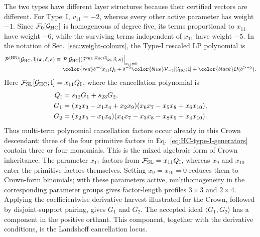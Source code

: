 \documentclass[a4paper,11pt]{article}
\newcommand{\x}{\boldsymbol{x}}
\newcommand{\s}{\boldsymbol{s}}
\newcommand{\HR}{\mathrm{HR}}
\newcommand{\SLcolour}[1]{{\color{red}#1}}
\newcommand{\HRcolour}[1]{{\color{blue}#1}}
\newcommand{\Othercolour}[1]{{\color{black}#1}}
\begin{document}
The two types have different layer structures because their certified vectors
are different.  For Type~I, \(v_{11}=-2\), whereas every other active parameter
has weight \(-1\).  Since \(\mathcal F_0[\mathcal G_{\rm HC}]\) is homogeneous
of degree five, its terms proportional to \(x_{11}\) have weight \(-6\), while
the surviving terms independent of \(x_{11}\) have weight \(-5\).  In the
notation of Sec.~\ref{sec:weight-colours}, the Type-I rescaled LP polynomial is
\begin{equation}
\begin{aligned}
 \mathcal P^{(\HR)}[\mathcal G_{\rm HC};{\rm I}](\x;\delta,\s)
 &\equiv
 \left.\mathcal P[\mathcal G_{\rm HC}]
   (\delta^{\boldsymbol v_{\HR}[\mathcal G_{\rm HC};{\rm I}]}\x;
    \delta,\s)\right|_{x_{12}=0}
 \\[-1mm]
 &=\SLcolour{\delta^{-6}x_{11}Q_{\rm I}}
  +\delta^{-5}\HRcolour{\mathcal P_{-5}[\mathcal G_{\rm HC};{\rm I}]}
  +\Othercolour{\mathcal O(\delta^{>-5})}.
\end{aligned}
 \label{eq:HC-type-I-decomposition}
\end{equation}
Here \(\mathcal F_{\rm SL}[\mathcal G_{\rm HC};{\rm I}]=x_{11}Q_{\rm I}\),
where the cancellation polynomial is
\begin{align}
 Q_{\rm I}&=s_{12}G_1+s_{23}G_2,\nonumber\\
 G_1&=(x_2x_3-x_1x_4+x_2x_9)
       (x_6x_7-x_5x_8+x_6x_{10}),\nonumber\\
 G_2&=(x_2x_5-x_1x_6)
       (x_4x_7-x_3x_8-x_8x_9+x_4x_{10}).
 \label{eq:HC-type-I-generators}
\end{align}
Thus multi-term polynomial cancellation factors occur already in this Crown
descendant: three of the four primitive factors in
Eq.~\eqref{eq:HC-type-I-generators} contain three or four monomials.  This is
the mixed algebraic form of Crown inheritance.  The parameter \(x_{11}\)
factors from \(\mathcal F_{\rm SL}=x_{11}Q_{\rm I}\), whereas \(x_9\) and
\(x_{10}\) enter the primitive factors themselves.  Setting
\(x_9=x_{10}=0\) reduces them to Crown-form binomials; with these parameters
active, multihomogeneity in the corresponding parameter groups gives
factor-length profiles \(3\mathbin{\times}3\) and
\(2\mathbin{\times}4\).  Applying the coefficientwise derivative harvest
illustrated for the Crown, followed by disjoint-support pairing, gives
\(G_1\) and \(G_2\).  The accepted ideal \(\langle G_1,G_2\rangle\) has a
component in the positive orthant.  This component, together with the
derivative conditions, is the Landshoff cancellation locus.
\end{document}

